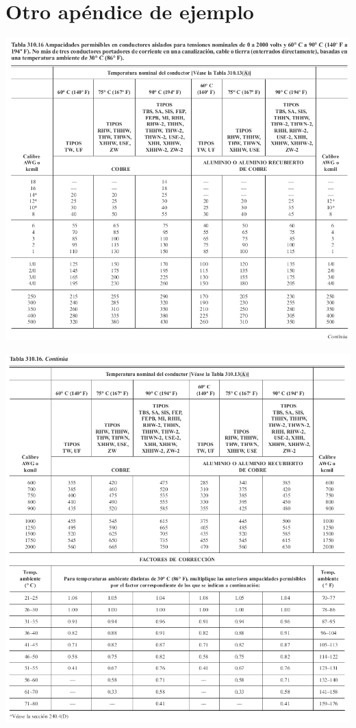 \chapter{Otro apéndice de ejemplo}
\label{B}

\includegraphics[width=1\textwidth]{./imagenes/cable1.png} 

\includegraphics[width=1\textwidth]{./imagenes/cable2.png} 